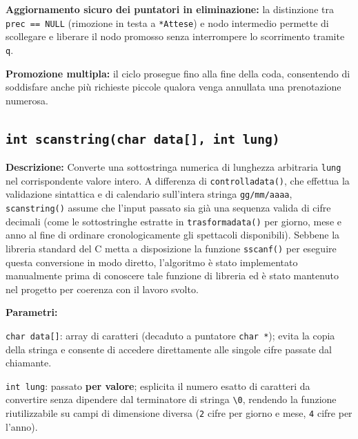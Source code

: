 \documentclass[11pt,a4paper,oneside,openany]{book}
\newenvironment{listacomp}{%
    \small
    \begin{list}{\textendash}{%
        \setlength{\topsep}{2pt}%
        \setlength{\partopsep}{0pt}%
        \setlength{\itemsep}{1pt}%
        \setlength{\parsep}{0pt}%
        \setlength{\leftmargin}{1.2em}%
    }%
}{%
    \end{list}%
}
\begin{document}
\begin{listacomp}
    \item \textbf{Aggiornamento sicuro dei puntatori in eliminazione:} la distinzione tra \texttt{prec == NULL} (rimozione in testa a \texttt{*Attese}) e nodo intermedio permette di scollegare e liberare il nodo promosso senza interrompere lo scorrimento tramite \texttt{q}.
    \item \textbf{Promozione multipla:} il ciclo prosegue fino alla fine della coda, consentendo di soddisfare anche più richieste piccole qualora venga annullata una prenotazione numerosa.
\end{listacomp}

\subsection[scanstring()]{\texttt{int scanstring(char data[], int lung)}}

\noindent\textbf{Descrizione:}
Converte una sottostringa numerica di lunghezza arbitraria \texttt{lung} nel corrispondente valore intero. A differenza di \texttt{controlladata()}, che effettua la validazione sintattica e di calendario sull'intera stringa \texttt{gg/mm/aaaa}, \texttt{scanstring()} assume che l'input passato sia già una sequenza valida di cifre decimali (come le sottostringhe estratte in \texttt{trasformadata()} per giorno, mese e anno al fine di ordinare cronologicamente gli spettacoli disponibili). Sebbene la libreria standard del C metta a disposizione la funzione \texttt{sscanf()} per eseguire questa conversione in modo diretto, l'algoritmo è stato implementato manualmente prima di conoscere tale funzione di libreria ed è stato mantenuto nel progetto per coerenza con il lavoro svolto.

\noindent\textbf{Parametri:}
\begin{listacomp}
    \item \texttt{char data[]}: array di caratteri (decaduto a puntatore \texttt{char *}); evita la copia della stringa e consente di accedere direttamente alle singole cifre passate dal chiamante.
    \item \texttt{int lung}: passato \textbf{per valore}; esplicita il numero esatto di caratteri da convertire senza dipendere dal terminatore di stringa \texttt{\textbackslash 0}, rendendo la funzione riutilizzabile su campi di dimensione diversa (\texttt{2} cifre per giorno e mese, \texttt{4} cifre per l'anno).
\end{listacomp}
\end{document}
